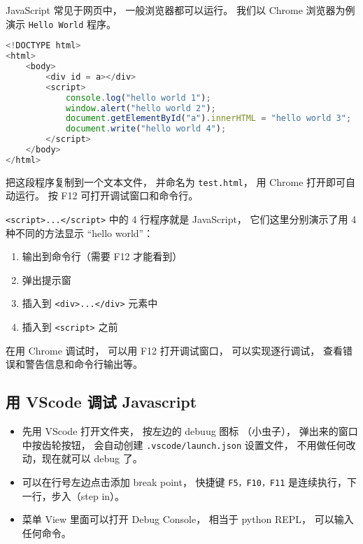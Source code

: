 
JavaScript 常见于网页中， 一般浏览器都可以运行。 我们以 Chrome 浏览器为例演示 \verb|Hello World| 程序。

\begin{lstlisting}[language=js]
<!DOCTYPE html>
<html>
	<body>
		<div id = a></div>
		<script>
            console.log("hello world 1");
            window.alert("hello world 2");
			document.getElementById("a").innerHTML = "hello world 3";
            document.write("hello world 4");
		</script>
	</body>
</html>
\end{lstlisting}
把这段程序复制到一个文本文件， 并命名为 \verb|test.html|， 用 Chrome 打开即可自动运行。 按 F12 可打开调试窗口和命令行。

\verb|<script>...</script>| 中的 4 行程序就是 JavaScript， 它们这里分别演示了用 4 种不同的方法显示 “hello world”：
\begin{enumerate}
\item 输出到命令行（需要 F12 才能看到）
\item 弹出提示窗
\item 插入到 \verb|<div>...</div>| 元素中
\item 插入到 \verb|<script>| 之前
\end{enumerate}

在用 Chrome 调试时， 可以用 F12 打开调试窗口， 可以实现逐行调试， 查看错误和警告信息和命令行输出等。

\subsection{用 VScode 调试 Javascript}
\begin{itemize}
\item 先用 VScode 打开文件夹， 按左边的 debuug 图标 （小虫子）， 弹出来的窗口中按齿轮按钮， 会自动创建 \verb`.vscode/launch.json` 设置文件， 不用做任何改动，现在就可以 debug 了。
\item 可以在行号左边点击添加 break point， 快捷键 \verb`F5，F10，F11` 是连续执行，下一行，步入（step in）。
\item 菜单 View 里面可以打开 Debug Console， 相当于 python REPL， 可以输入任何命令。
\end{itemize}

